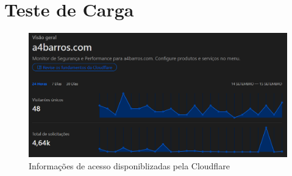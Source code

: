\chapter{Teste de Carga}





\begin{figure}[ht]
    \begin{center}
    \includegraphics[width=400pt]{img/cloudflare-stat.png}
    \caption{Informações de acesso disponiblizadas pela Cloudflare}
    \label{fig:cloudflare-stat.png}
    \end{center}
\end{figure}